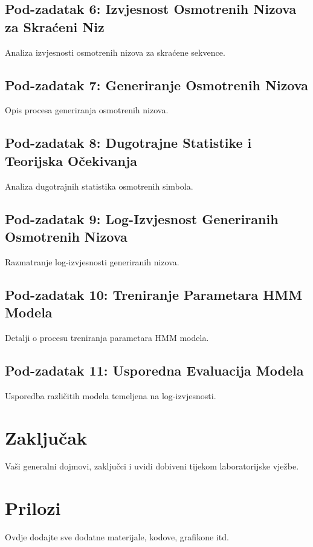 \documentclass[12pt]{article}
\begin{document}
	\subsection{Pod-zadatak 6: Izvjesnost Osmotrenih Nizova za Skraćeni Niz}
	Analiza izvjesnosti osmotrenih nizova za skraćene sekvence.
	
	\subsection{Pod-zadatak 7: Generiranje Osmotrenih Nizova}
	Opis procesa generiranja osmotrenih nizova.
	
	\subsection{Pod-zadatak 8: Dugotrajne Statistike i Teorijska Očekivanja}
	Analiza dugotrajnih statistika osmotrenih simbola.
	
	\subsection{Pod-zadatak 9: Log-Izvjesnost Generiranih Osmotrenih Nizova}
	Razmatranje log-izvjesnosti generiranih nizova.
	
	\subsection{Pod-zadatak 10: Treniranje Parametara HMM Modela}
	Detalji o procesu treniranja parametara HMM modela.
	
	\subsection{Pod-zadatak 11: Usporedna Evaluacija Modela}
	Usporedba različitih modela temeljena na log-izvjesnosti.
	
	\section{Zaključak}
	Vaši generalni dojmovi, zaključci i uvidi dobiveni tijekom laboratorijske vježbe.
	
	\section{Prilozi}
	Ovdje dodajte sve dodatne materijale, kodove, grafikone itd.
	
\end{document}
